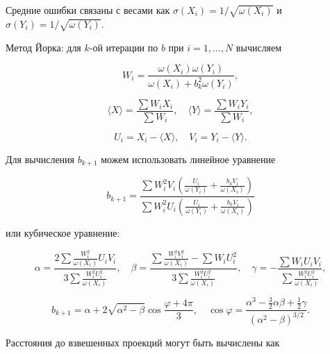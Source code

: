 \documentclass[a4paper, oneside]{article}
\newcommand{\su}{\vspace{-0.5em}}
\begin{document}
Средние ошибки связаны с весами как $ σ(X_i) = 1 / \sqrt{\omega(X_i)} $ и $ σ(Y_i) = 1 / \sqrt{\omega(Y_i)} $.

\vspace{\baselineskip}

Метод Йорка: для $ k $-ой итерации по $ b $ при $ i = 1, \dots, N $ вычисляем

\su
\begin{equation}
  W_i = \frac{\omega(X_i) \omega(Y_i)}{\omega(X_i) + b_k^2 \omega(Y_i)},
\end{equation}

\su
\begin{equation}
  \langle X \rangle = \frac{\sum W_i X_i}{\sum W_i}, \quad \langle Y \rangle = \frac{\sum W_i Y_i}{\sum W_i},
\end{equation}

\su
\begin{equation}
  U_i = X_i - \langle X \rangle, \quad V_i = Y_i - \langle Y \rangle.
\end{equation}

Для вычисления $ b_{k+1} $ можем использовать линейное уравнение

\su
\begin{equation}
  b_{k+1} = \frac{\displaystyle \sum W_i^2 V_i \left( \frac{U_i}{\omega(Y_i)} + \frac{b_k V_i}{\omega(X_i)} \right)}{\displaystyle \sum W_i^2 U_i \left( \frac{U_i}{\omega(Y_i)} + \frac{b_k V_i}{\omega(X_i)} \right)}
\end{equation}

или кубическое уравнение:

\su
\begin{equation}
  \alpha = \frac{\displaystyle 2 \sum \frac{W_i^2}{\omega(X_i)} U_i V_i}{\displaystyle 3 \sum \frac{W_i^2 U_i^2}{\omega(X_i)}}, \quad
  \beta = \frac{\displaystyle \sum \frac{W_i^2 V_i^2}{\omega(X_i)} - \textstyle \sum W_i U_i^2}{\displaystyle 3 \sum \frac{W_i^2 U_i^2}{\omega(X_i)}}, \quad
  \gamma = -\frac{\sum \displaystyle W_i U_i V_i}{\displaystyle \sum \frac{W_i^2 U_i^2}{\omega(X_i)}},
\end{equation}

\su
\begin{equation}
  b_{k+1} = \alpha + 2 \sqrt{\alpha^2 - \beta} \cos{\frac{\varphi + 4 \pi}{3}}, \quad \cos{\varphi} = \frac{\alpha^3 - \frac{3}{2} \alpha \beta + \frac{1}{2} \gamma}{(\alpha^2 - \beta)^{3/2}}.
\end{equation}

\newpage

Расстояния до взвешенных проекций могут быть вычислены как
\end{document}

